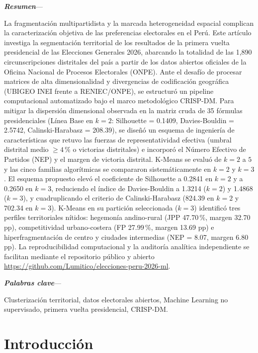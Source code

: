 \documentclass[conference,10pt,letterpaper]{IEEEtran}
\makeatletter
\renewenvironment{abstract}{%
  \normalfont\@IEEEabskeysecsize
  \noindent\textbf{\textit{\abstractname}}---\relax
}{\par\normalfont\normalsize}
\renewenvironment{IEEEkeywords}{%
  \normalfont\@IEEEabskeysecsize
  \noindent\textbf{\textit{\IEEEkeywordsname}}---\relax
}{\par\normalfont\normalsize}
\makeatother
\begin{document}
\renewcommand\abstractname{Resumen}
\renewcommand\IEEEkeywordsname{Palabras clave}
\begin{abstract}
La fragmentación multipartidista y la marcada heterogeneidad espacial complican la caracterización objetiva de las preferencias electorales en el Perú. Este artículo investiga la segmentación territorial de los resultados de la primera vuelta presidencial de las Elecciones Generales 2026, abarcando la totalidad de las 1,890 circunscripciones distritales del país a partir de los datos abiertos oficiales de la Oficina Nacional de Procesos Electorales (ONPE). Ante el desafío de procesar matrices de alta dimensionalidad y divergencias de codificación geográfica (UBIGEO INEI frente a RENIEC/ONPE), se estructuró un pipeline computacional automatizado bajo el marco metodológico CRISP-DM. Para mitigar la dispersión dimensional observada en la matriz cruda de 35 fórmulas presidenciales (Línea Base en $k = 2$: Silhouette = 0.1409, Davies-Bouldin = 2.5742, Calinski-Harabasz = 208.39), se diseñó un esquema de ingeniería de características que retuvo las fuerzas de representatividad efectiva (umbral distrital medio $\ge 4\,\%$ o victorias distritales) e incorporó el Número Efectivo de Partidos (NEP) y el margen de victoria distrital. K-Means se evaluó de $k = 2$ a $5$ y las cinco familias algorítmicas se compararon sistemáticamente en $k = 2$ y $k = 3$. El esquema propuesto elevó el coeficiente de Silhouette a 0.2841 en $k = 2$ y a 0.2650 en $k = 3$, reduciendo el índice de Davies-Bouldin a 1.3214 ($k = 2$) y 1.4868 ($k = 3$), y cuadruplicando el criterio de Calinski-Harabasz (824.39 en $k = 2$ y 702.34 en $k = 3$). K-Means en su partición seleccionada ($k = 3$) identificó tres perfiles territoriales nítidos: hegemonía andino-rural (JPP 47.70\,\%, margen 32.70 pp), competitividad urbano-costera (FP 27.99\,\%, margen 13.69 pp) e hiperfragmentación de centro y ciudades intermedias (NEP = 8.07, margen 6.80 pp). La reproducibilidad computacional y la auditoría analítica independiente se facilitan mediante el repositorio público y abierto \url{https://github.com/Lumitico/elecciones-peru-2026-ml}.
\end{abstract}

\begin{IEEEkeywords}
Clusterización territorial, datos electorales abiertos, Machine Learning no supervisado, primera vuelta presidencial, CRISP-DM.
\end{IEEEkeywords}

\section{Introducción}
\end{document}
